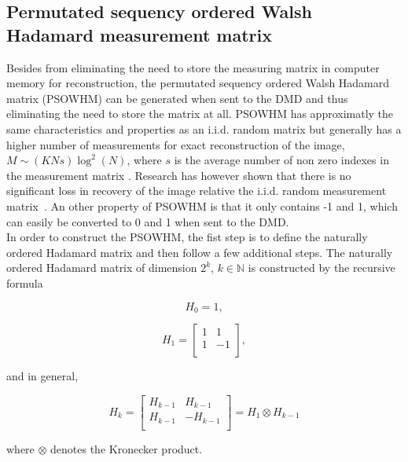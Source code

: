 \subsection{Permutated sequency ordered Walsh Hadamard measurement matrix}
\label{sec:SOWHMM}
Besides from eliminating the need to store the measuring matrix in computer memory for reconstruction, the permutated sequency ordered Walsh Hadamard matrix (PSOWHM) can be generated when sent to the DMD and thus eliminating the need to store the matrix at all. PSOWHM has approximatly the same characteristics and properties as an i.i.d. random matrix but generally has a higher number of measurements for exact reconstruction of the image, $M \sim (KNs)\log^2(N)$, where $s$ is the average number of non zero indexes in the measurement matrix \cite{lec:fast_CS_SRM}. Research has however shown that there is no significant loss in recovery of the image relative the i.i.d. random measurement matrix~\cite{article:an_improved_WH_matrix}. An other property of PSOWHM is that it only contains -1 and 1, which can easily be converted to 0 and 1 when sent to the DMD. \\[0.1in]


In order to construct the PSOWHM, the fist step is to define the naturally ordered Hadamard matrix and then follow a few additional steps. The naturally ordered Hadamard matrix of dimension $2^k$, $k \in \mathbb{N}$ is constructed by the recursive formula    

\begin{equation}
    H_0 = 1,
\end{equation}

\begin{equation}
    H_1 = \begin{bmatrix}
       1 & 1 \\
       1 & -1\\
     \end{bmatrix},
\end{equation}

and in general,

\begin{equation}
        H_k = \begin{bmatrix}
       H_{k-1} & H_{k-1} \\
       H_{k-1} & -H_{k-1}\\
       \end{bmatrix} = H_1 \otimes H_{k-1}
\end{equation}

where $\otimes$ denotes the Kronecker product.\\[0.1in]

